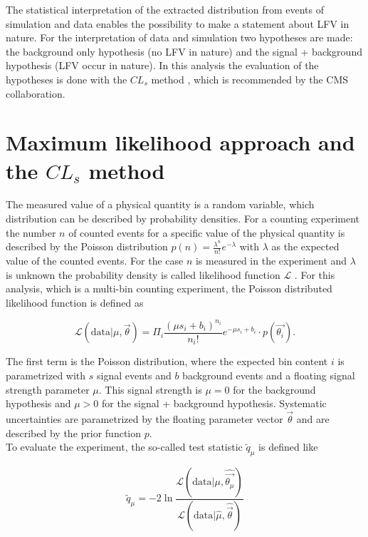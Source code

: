 The statistical interpretation of the extracted distribution from events of simulation and data enables the possibility to make a statement about \gls{LFV} in nature. For the interpretation of data and simulation two hypotheses are made: the background only hypothesis (no \gls{LFV} in nature) and the signal + background hypothesis (\gls{LFV} occur in nature). In this analysis the evaluation of the hypotheses  is done with the $CL_s$ method \cite{CLS}, which is recommended by the \gls{CMS} collaboration. 

\section{Maximum likelihood approach and the $CL_s$ method}
\label{sec:section_5_1}

The measured value of a physical quantity is a random variable, which distribution can be described by probability densities. For a counting experiment the number $n$ of counted events for a specific value of the physical quantity is described by the Poisson distribution $p(n) = \frac{\lambda^{n}}{n!}e^{-\lambda}$ with $\lambda$ as the expected value of the counted events. For the case $n$ is measured in the experiment and $\lambda$ is unknown the probability density is called likelihood function $\mathcal{L}$ \cite{LIKELIHOOD}. For this analysis, which is a multi-bin counting experiment, the Poisson distributed likelihood function is defined as

\begin{equation}
	\label{eq:eq_5_1}
	\mathcal{L}(\text{data} | \mu, \vec{\theta}) = \Pi_{i} \frac{(\mu s_i+ b_i)^{n_i}}{n_i!} e^{-\mu s_i +b_i} \cdot p(\vec{\theta_i}).
\end{equation}

The first term is the Poisson distribution, where the expected bin content $i$ is parametrized with $s$ signal events and $b$ background events and a floating signal strength parameter $\mu$. This signal strength is $\mu = 0$ for the background hypothesis and $\mu>0$ for the signal + background hypothesis. Systematic uncertainties are parametrized by the floating parameter vector $\vec{\theta}$ and are described by the prior function $p$.  \\

To evaluate the experiment, the so-called test statistic $\tilde{q}_{\mu}$ is defined like 

\begin{equation}
	\label{eq:eq_5_2}
	\tilde{q}_{\mu} = -2\ln{\frac{\mathcal{L}(\text{data} | \mu, \hat{\vec{\theta_{\mu}}})}{\mathcal{L}(\text{data} | \hat{\mu}, \hat{\vec{\theta}})}}
\end{equation}

